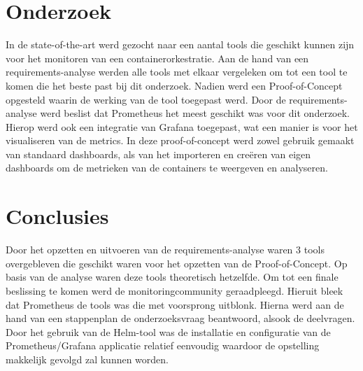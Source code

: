 \documentclass[a0,portrait]{a0poster}
\begin{document}
\begin{multicols}{2}

\color{Black} %
\color{HoGentAccent1} 
\section*{Onderzoek}
\color{black}

In de state-of-the-art werd gezocht naar een aantal tools die geschikt kunnen zijn voor het monitoren van een containerorkestratie. Aan de hand van een requirements-analyse werden alle tools met elkaar vergeleken om tot een tool te komen die het beste past bij dit onderzoek. Nadien werd een Proof-of-Concept opgesteld waarin de werking van de tool toegepast werd. Door de requirements-analyse werd beslist dat Prometheus het meest geschikt was voor dit onderzoek. Hierop werd ook een integratie van Grafana toegepast, wat een manier is voor het visualiseren van de metrics. In deze proof-of-concept werd zowel gebruik gemaakt van standaard dashboards, als van het importeren en creëren van eigen dashboards om de metrieken van de containers te weergeven en analyseren.







\color{HoGentAccent1} 
\section*{Conclusies}
\color{black}

Door het opzetten en uitvoeren van de requirements-analyse waren 3 tools overgebleven die geschikt waren voor het opzetten van de Proof-of-Concept. Op basis van de analyse waren deze tools theoretisch hetzelfde. Om tot een finale beslissing te komen werd de monitoringcommunity geraadpleegd. Hieruit bleek dat Prometheus de tools was die met voorsprong uitblonk. Hierna werd aan de hand van een stappenplan de onderzoeksvraag beantwoord, alsook de deelvragen. Door het gebruik van de Helm-tool was de installatie en configuratie van de Prometheus/Grafana applicatie relatief eenvoudig waardoor de opstelling makkelijk gevolgd zal kunnen worden. 


\end{multicols}
\end{document}
